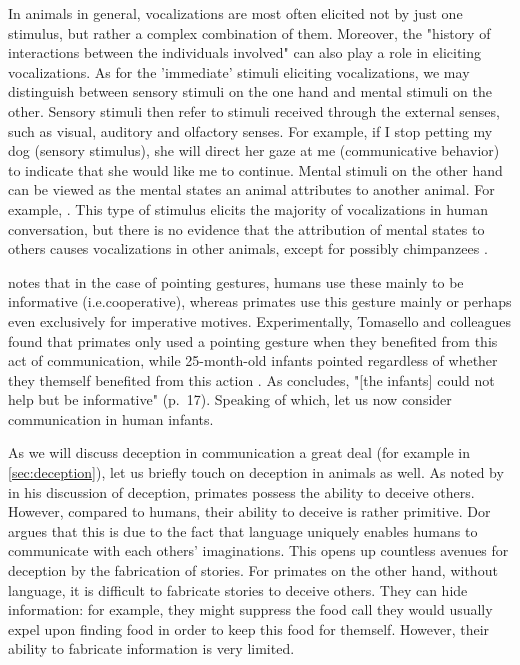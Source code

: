In animals in general, vocalizations are most often elicited not by just one stimulus, but rather a complex combination of them. Moreover, the "history of interactions between the individuals involved" \citep[p.~151]{SeyfarthCheney03} can also play a role in eliciting vocalizations. As for the 'immediate' stimuli eliciting vocalizations, we may distinguish between sensory stimuli on the one hand and mental stimuli on the other. Sensory stimuli then refer to stimuli received through the external senses, such as visual, auditory and olfactory senses.
For example, if I stop petting my dog (sensory stimulus), she will direct her gaze at me (communicative behavior) to indicate that she would like me to continue.
Mental stimuli on the other hand can be viewed as the mental states an animal attributes to another animal.
For example, .
This type of stimulus elicits the majority of vocalizations in human conversation, but there is no evidence that the attribution of mental states to others causes vocalizations in other animals, except for possibly chimpanzees \citep{SeyfarthCheney03}.

\citet{Tomasello09} notes that in the case of pointing gestures, humans use these mainly to be informative (i.e.\@ cooperative), whereas primates use this gesture mainly or perhaps even exclusively for imperative motives. Experimentally, Tomasello and colleagues found that primates only used a pointing gesture when they benefited from this act of communication, while 25-month-old infants pointed regardless of whether they themself benefited from this action \citep{Bullinger11}. As \citet{Tomasello09} concludes, "[the infants] could not help but be informative" (p.~17). Speaking of which, let us now consider communication in human infants.

As we will discuss deception in communication a great deal (for example in \cref{sec:deception}), let us briefly touch on deception in animals as well. As noted by \citet{Dor17} in his discussion of deception, primates possess the ability to deceive others.
However, compared to humans, their ability to deceive is rather primitive. Dor argues that this is due to the fact that language uniquely enables humans to communicate with each others' imaginations. This opens up countless avenues for deception by the fabrication of stories. For primates on the other hand, without language, it is difficult to fabricate stories to deceive others. They can hide information: for example, they might suppress the food call they would usually expel upon finding food in order to keep this food for themself. However, their ability to fabricate information is very limited.

